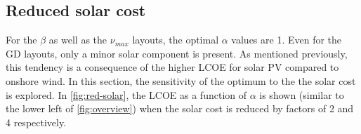\documentclass[a4paper, 5p, sort&compress]{elsarticle}%
\begin{document}
%
%

\subsection{Reduced solar cost}
\label{sec:reduced-solar-cost}

For the $\beta$ as well as the $\nu_{max}$ layouts, the optimal
$\alpha$ values are 1. Even for the GD layouts, only a minor solar
component is present. As mentioned previously, this tendency is a
consequence of the higher LCOE for solar PV compared to onshore
wind. In this section, the sensitivity of the optimum to the the solar
cost is explored. In \cref{fig:red-solar}, the LCOE as a function of
$\alpha$ is shown (similar to the lower left of \cref{fig:overview}) when
the solar cost is reduced by factors of 2 and 4 respectively.
\end{document}
